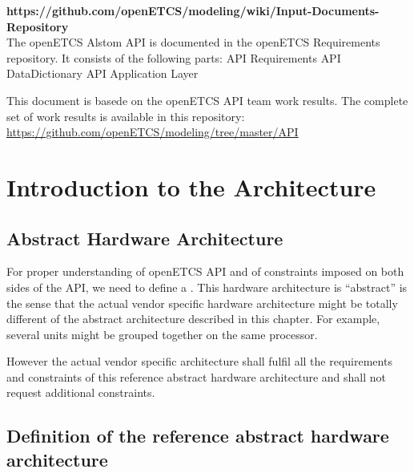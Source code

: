 \documentclass{template/openetcs_report}
\begin{document}
\textbf{https://github.com/openETCS/modeling/wiki/Input-Documents-Repository}\\

The openETCS Alstom API is documented in the openETCS Requirements repository. It consists of the following parts:
\cite{alstom-api} API Requirements
\cite{alstom-api-data-dict} API DataDictionary
\cite{alstom-api-app-layer} API Application Layer

This document is basede on the openETCS API team work results. The complete set of work results is available in this repository: \url{https://github.com/openETCS/modeling/tree/master/API}

\chapter{Introduction to the Architecture}

\section{Abstract Hardware Architecture}

For proper understanding of openETCS \gls{API} and of constraints imposed on
both sides of the \gls{API}, we need to define a . This hardware architecture is ``abstract''
is the sense that the actual vendor specific hardware architecture
might be totally different of the abstract architecture described in
this chapter. For example, several units might be grouped together on
the same processor.

However the actual vendor specific architecture shall fulfil all the
requirements and constraints of this reference abstract hardware
architecture and shall not request additional constraints.

\section{Definition of the reference abstract hardware architecture}
\end{document}
